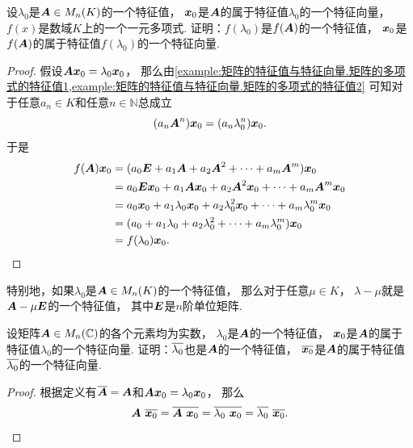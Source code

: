 \begin{example}\label{example:矩阵的特征值与特征向量.矩阵的多项式的特征值4}
设\(\lambda_0\)是\(\boldsymbol{A} \in M_n(K)\)的一个特征值，
\(\boldsymbol{x}_0\)是\(\boldsymbol{A}\)的属于特征值\(\lambda_0\)的一个特征向量，
\(f(x)\)是数域\(K\)上的一个一元多项式.
证明：\(f(\lambda_0)\)是\(f(\boldsymbol{A})\)的一个特征值，
\(\boldsymbol{x}_0\)是\(f(\boldsymbol{A})\)的属于特征值\(f(\lambda_0)\)的一个特征向量.
\begin{proof}
假设\(\boldsymbol{A} \boldsymbol{x}_0 = \lambda_0 \boldsymbol{x}_0\)，
那么由\cref{example:矩阵的特征值与特征向量.矩阵的多项式的特征值1,example:矩阵的特征值与特征向量.矩阵的多项式的特征值2}
可知对于任意\(a_n \in K\)和任意\(n\in\mathbb{N}\)总成立\begin{equation*}
	(a_n \boldsymbol{A}^n) \boldsymbol{x}_0
	= (a_n \lambda_0^n) \boldsymbol{x}_0.
\end{equation*}
于是\begin{align*}
	f(\boldsymbol{A}) \boldsymbol{x}_0
	&= (a_0 \boldsymbol{E} + a_1 \boldsymbol{A} + a_2 \boldsymbol{A}^2 + \dotsb + a_m \boldsymbol{A}^m) \boldsymbol{x}_0 \\
	&= a_0 \boldsymbol{E} \boldsymbol{x}_0 + a_1 \boldsymbol{A} \boldsymbol{x}_0 + a_2 \boldsymbol{A}^2 \boldsymbol{x}_0 + \dotsb + a_m \boldsymbol{A}^m \boldsymbol{x}_0 \\
	&= a_0 \boldsymbol{x}_0 + a_1 \lambda_0 \boldsymbol{x}_0 + a_2 \lambda_0^2 \boldsymbol{x}_0 + \dotsb + a_m \lambda_0^m \boldsymbol{x}_0 \\
	&= (a_0 + a_1 \lambda_0 + a_2 \lambda_0^2 + \dotsb + a_m \lambda_0^m) \boldsymbol{x}_0 \\
	&= f(\lambda_0) \boldsymbol{x}_0.
	\qedhere
\end{align*}
\end{proof}
\end{example}
\begin{remark}
特别地，如果\(\lambda_0\)是\(\boldsymbol{A} \in M_n(K)\)的一个特征值，
那么对于任意\(\mu \in K\)，
\(\lambda - \mu\)就是\(\boldsymbol{A} - \mu \boldsymbol{E}\)的一个特征值，
其中\(\boldsymbol{E}\)是\(n\)阶单位矩阵.
\end{remark}
\begin{example}
设矩阵\(\boldsymbol{A} \in M_n(\mathbb{C})\)的各个元素均为实数，
\(\lambda_0\)是\(\boldsymbol{A}\)的一个特征值，
\(\boldsymbol{x}_0\)是\(\boldsymbol{A}\)的属于特征值\(\lambda_0\)的一个特征向量.
证明：\(\overline{\lambda_0}\)也是\(\boldsymbol{A}\)的一个特征值，
\(\overline{\boldsymbol{x}_0}\)是\(\boldsymbol{A}\)的属于特征值\(\overline{\lambda_0}\)的一个特征向量.
\begin{proof}
根据定义有\(\overline{\boldsymbol{A}} = \boldsymbol{A}\)和\(\boldsymbol{A} \boldsymbol{x}_0 = \lambda_0 \boldsymbol{x}_0\)，
那么\begin{equation*}
	\boldsymbol{A}~\overline{\boldsymbol{x}_0}
	= \overline{\boldsymbol{A}~\boldsymbol{x}_0}
	= \overline{\lambda_0~\boldsymbol{x}_0}
	= \overline{\lambda_0}~\overline{\boldsymbol{x}_0}.
	\qedhere
\end{equation*}
\end{proof}
\end{example}

